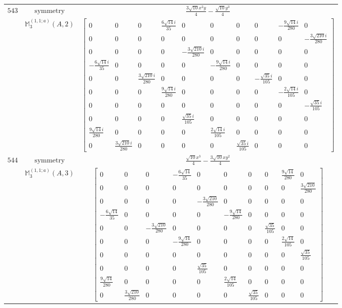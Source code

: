 \documentclass[fleqn,8pt,landscape]{jsarticle}
\begin{document}
\begin{longtable}{ccc}
$ 543 $ & $ \text{symmetry} $ & $ \frac{3 \sqrt{10} x^{2} y}{4} - \frac{\sqrt{10} y^{3}}{4} $ \\
$  $ & $ \mathbb{M}_{3}^{(1,1;a)}(A,2) $ & $ \begin{bmatrix} 0 & 0 & 0 & \frac{6 \sqrt{14} i}{35} & 0 & 0 & 0 & 0 & - \frac{9 \sqrt{14} i}{280} & 0 \\ 0 & 0 & 0 & 0 & 0 & 0 & 0 & 0 & 0 & - \frac{3 \sqrt{210} i}{280} \\ 0 & 0 & 0 & 0 & - \frac{3 \sqrt{210} i}{280} & 0 & 0 & 0 & 0 & 0 \\ - \frac{6 \sqrt{14} i}{35} & 0 & 0 & 0 & 0 & - \frac{9 \sqrt{14} i}{280} & 0 & 0 & 0 & 0 \\ 0 & 0 & \frac{3 \sqrt{210} i}{280} & 0 & 0 & 0 & 0 & - \frac{\sqrt{35} i}{105} & 0 & 0 \\ 0 & 0 & 0 & \frac{9 \sqrt{14} i}{280} & 0 & 0 & 0 & 0 & - \frac{2 \sqrt{14} i}{105} & 0 \\ 0 & 0 & 0 & 0 & 0 & 0 & 0 & 0 & 0 & - \frac{\sqrt{35} i}{105} \\ 0 & 0 & 0 & 0 & \frac{\sqrt{35} i}{105} & 0 & 0 & 0 & 0 & 0 \\ \frac{9 \sqrt{14} i}{280} & 0 & 0 & 0 & 0 & \frac{2 \sqrt{14} i}{105} & 0 & 0 & 0 & 0 \\ 0 & \frac{3 \sqrt{210} i}{280} & 0 & 0 & 0 & 0 & \frac{\sqrt{35} i}{105} & 0 & 0 & 0 \end{bmatrix} $ \\ \hline
$ 544 $ & $ \text{symmetry} $ & $ \frac{\sqrt{10} x^{3}}{4} - \frac{3 \sqrt{10} x y^{2}}{4} $ \\
$  $ & $ \mathbb{M}_{3}^{(1,1;a)}(A,3) $ & $ \begin{bmatrix} 0 & 0 & 0 & - \frac{6 \sqrt{14}}{35} & 0 & 0 & 0 & 0 & \frac{9 \sqrt{14}}{280} & 0 \\ 0 & 0 & 0 & 0 & 0 & 0 & 0 & 0 & 0 & \frac{3 \sqrt{210}}{280} \\ 0 & 0 & 0 & 0 & - \frac{3 \sqrt{210}}{280} & 0 & 0 & 0 & 0 & 0 \\ - \frac{6 \sqrt{14}}{35} & 0 & 0 & 0 & 0 & - \frac{9 \sqrt{14}}{280} & 0 & 0 & 0 & 0 \\ 0 & 0 & - \frac{3 \sqrt{210}}{280} & 0 & 0 & 0 & 0 & \frac{\sqrt{35}}{105} & 0 & 0 \\ 0 & 0 & 0 & - \frac{9 \sqrt{14}}{280} & 0 & 0 & 0 & 0 & \frac{2 \sqrt{14}}{105} & 0 \\ 0 & 0 & 0 & 0 & 0 & 0 & 0 & 0 & 0 & \frac{\sqrt{35}}{105} \\ 0 & 0 & 0 & 0 & \frac{\sqrt{35}}{105} & 0 & 0 & 0 & 0 & 0 \\ \frac{9 \sqrt{14}}{280} & 0 & 0 & 0 & 0 & \frac{2 \sqrt{14}}{105} & 0 & 0 & 0 & 0 \\ 0 & \frac{3 \sqrt{210}}{280} & 0 & 0 & 0 & 0 & \frac{\sqrt{35}}{105} & 0 & 0 & 0 \end{bmatrix} $ \\ \hline

\end{longtable}
\end{document}
